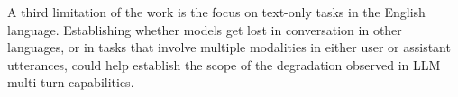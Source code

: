 \documentclass{article}
\begin{document}
A third limitation of the work is the focus on text-only tasks in the English language. Establishing whether models get lost in conversation in other languages, or in tasks that involve multiple modalities in either user or assistant utterances, could help establish the scope of the degradation observed in LLM multi-turn capabilities.






\bigskip



\end{document}
